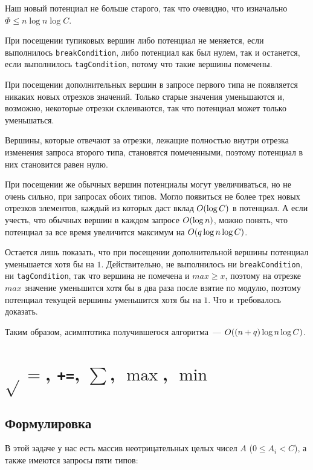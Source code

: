 Наш новый потенциал не больше старого, так что очевидно, что изначально $\Phi \le n \log n \log C$.

При посещении тупиковых вершин либо потенциал не меняется, если выполнилось \verb+breakCondition+, либо потенциал как был нулем, так и останется, если выполнилось \verb+tagCondition+, потому что такие вершины помечены.

При посещении дополнительных вершин в запросе первого типа не появляется никаких новых отрезков значений. Только старые значения уменьшаются и, возможно, некоторые отрезки склеиваются, так что потенциал может только уменьшаться.

Вершины, которые отвечают за отрезки, лежащие полностью внутри отрезка изменения запроса второго типа, становятся помеченными, поэтому потенциал в них становится равен нулю.

При посещении же обычных вершин потенциалы могут увеличиваться, но не очень сильно, при запросах обоих типов. Могло появиться не более трех новых отрезков элементов, каждый из которых даст вклад $O(\log C)$ в потенциал. А если учесть, что обычных вершин в каждом запросе $O(\log n)$, можно понять, что потенциал за все время увеличится максимум на $O(q \log n \log C)$.

Остается лишь показать, что при посещении дополнительной вершины потенциал уменьшается хотя бы на $1$. Действительно, не выполнилось ни \verb+breakCondition+, ни \verb+tagCondition+, так что вершина не помечена и $max \ge x$, поэтому на отрезке $max$ значение уменьшится хотя бы в два раза после взятие по модулю, поэтому потенциал текущей вершины уменьшится хотя бы на $1$. Что и требовалось доказать.

Таким образом, асимптотика получившегося алгоритма~--- $O((n + q) \log n \log C)$.

\cprotect \section{$\sqrt{}=$, \verb^+=^, $\sum$, $\max$, $\min$}

\subsection{Формулировка}

В этой задаче у нас есть массив неотрицательных целых чисел $A$ ($0 \le A_i < C$), а также имеются запросы пяти типов:


